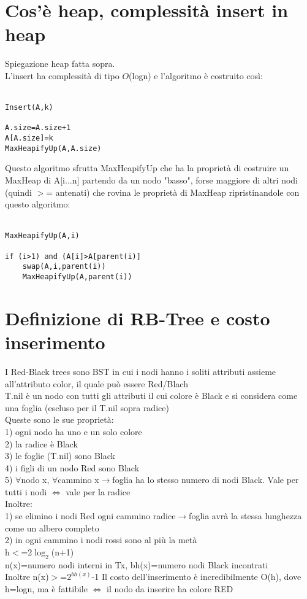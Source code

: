 \documentclass[12pt,oneside,a4paper]{article}
\newcommand\Omicron{O}
\begin{document}
\section{Cos'è heap, complessità insert in heap}
Spiegazione heap fatta sopra.\\
L'insert ha complessità di tipo $\Omicron$(logn) e l'algoritmo è costruito così:\\\\
\begin{lstlisting}[style=pseudocodice]
Insert(A,k)

A.size=A.size+1
A[A.size]=k
MaxHeapifyUp(A,A.size)
\end{lstlisting}
Questo algoritmo sfrutta MaxHeapifyUp che ha la proprietà di costruire un MaxHeap di A[i...n] partendo da un nodo "basso", forse maggiore di altri nodi (quindi $>$= antenati) che rovina le proprietà di MaxHeap ripristinandole con questo algoritmo:\\\\
\begin{lstlisting}[style=pseudocodice]
MaxHeapifyUp(A,i)

if (i>1) and (A[i]>A[parent(i)]
	swap(A,i,parent(i))
	MaxHeapifyUp(A,parent(i))
\end{lstlisting}
\newpage
\section{Definizione di RB-Tree e costo inserimento}
I Red-Black trees sono BST in cui i nodi hanno i soliti attributi assieme all'attributo color, il quale può essere Red/Blach\\
T.nil è un nodo con tutti gli attributi il cui colore è Black e si considera come una foglia (escluso per il T.nil sopra radice)\\
Queste sono le sue proprietà:\\
1) ogni nodo ha uno e un solo colore \\
2) la radice è Black\\
3) le foglie (T.nil) sono Black\\
4) i figli di un nodo Red sono Black\\
5) $\forall$nodo x, $\forall$cammino x$\to$foglia ha lo stesso numero di nodi Black. Vale per tutti i nodi $\iff$ vale per la radice\\
Inoltre:\\
1) se elimino i nodi Red ogni cammino radice$\to$foglia avrà la stessa lunghezza come un albero completo \\
2) in ogni cammino i nodi rossi sono al più la metà \\
h$<$=2$\log_{2}$(n+1)\\
n(x)=numero nodi interni in Tx, bh(x)=numero nodi Black incontrati\\
Inoltre n(x)$>$=$2^{bh(x)}$-1
Il costo dell'inserimento è incredibilmente O(h), dove h=logn, ma è fattibile $\iff$ il nodo da inserire ha colore RED\\
\newpage
\end{document}
